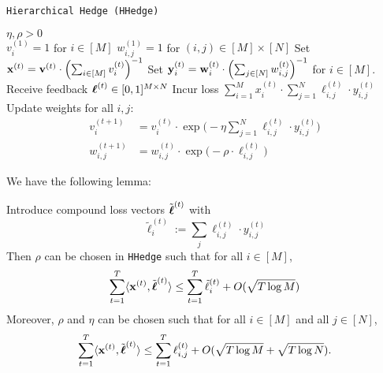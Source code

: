 \begin{algorithm}
   \caption{\texttt{Hierarchical Hedge (HHedge)}}
   \label{alg:meta-hedge}
   \begin{algorithmic}   
   	 $\eta,\rho>0$\\
   	\STATE $v^{(1)}_{i}=1$ for $i\in[M]$
   	\STATE $w^{(1)}_{i,j}=1$ for $(i,j)\in[M]\times[N]$
	   \STATE Set ${\mathbf x}^{(t)} = {\mathbf v}^{(t)}\cdot\left(\sum_{i\in[M]} v^{(t)}_{i}\right)^{-1}$
	   \STATE Set ${\mathbf y}^{(t)}_{i} = {\mathbf w}^{(t)}_{i}\cdot \left(\sum_{j\in[N]} w^{(t)}_{i,j}\right)^{-1}$ for $i\in[M]$.
		\STATE Receive feedback $\boldsymbol\ell^{(t)}\in [0,1]^{M\times N}$
		\STATE Incur loss $\sum_{i=1}^{M} x^{(t)}_{i}\cdot\sum_{j=1}^N\ell^{(t)}_{i,j}\cdot y^{(t)}_{i,j}$
		\STATE Update weights for all $i,j$:
		\begin{align}
			v^{(t+1)}_i & = v^{(t)}_{i}\cdot \exp\big(-\eta \sum_{j=1}^N\ell^{(t)}_{i,j}\cdot y^{(t)}_{i,j}\big)
			\\
			w^{(t+1)}_{i,j} & = w^{(t)}_{i,j}\cdot \exp\big(-\rho\cdot \ell^{(t)}_{i,j}\big)
		\end{align}
    	\ENDFOR
   	\end{algorithmic}
\end{algorithm}

We have the following lemma:

\begin{lem}\label{lem:meta-hedge}
	Introduce compound loss vectors $\tilde{\boldsymbol\ell}^{(t)}$ with 
	$$\tilde{\ell}^{(t)}_i := \sum_j \ell^{(t)}_{i,j}\cdot y^{(t)}_{i,j}$$
	Then $\rho$ can be chosen in \texttt{HHedge} such that for all $i\in[M]$,
	\begin{equation}
		\sum_{t=1}^T \langle {\mathbf x}^{(t)},\tilde{\boldsymbol\ell}^{(t)}\rangle 
		\leq  \sum_{t=1}^T \tilde{\ell}^{(t)}_i +
		 O(\sqrt{T \log M})
	\end{equation}
	Moreover, $\rho$ and $\eta$ can be chosen such that for all $i\in[M]$ and all $j\in[N]$,
	\begin{equation}
	   \sum_{t=1}^T \langle {\mathbf x}^{(t)},\tilde{\boldsymbol\ell}^{(t)}\rangle 
		\leq \sum_{t=1}^T\ell^{(t)}_{i,j}
		+ O(\sqrt{T \log M} + \sqrt{T \log N}).
	\end{equation}
\end{lem}




